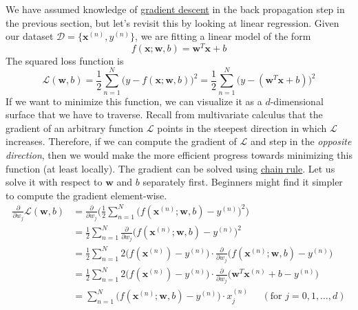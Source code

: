   \begin{example}
    \label{ex:linear-regression}
    We have assumed knowledge of \hyperref[def:gradient_descent]{gradient descent} in the back propagation step in the previous section, but let's revisit this by looking at linear regression. Given our dataset $\mathcal{D} = \{\mathbf{x}^(n), y^{(n)}\}$, we are fitting a linear model of the form 
    \begin{equation}
      f(\mathbf{x}; \mathbf{w}, b) = \mathbf{w}^T \mathbf{x} + b
    \end{equation} 
    The squared loss function is 
    \begin{equation}
      \mathcal{L}(\mathbf{w}, b) = \frac{1}{2} \sum_{n=1}^N \big( y - f(\mathbf{x}; \mathbf{w}, b) \big)^2 = \frac{1}{2} \sum_{n=1}^N \big( y - (\mathbf{w}^T \mathbf{x} + b) \big)^2  
    \end{equation}
    If we want to minimize this function, we can visualize it as a $d$-dimensional surface that we have to traverse. Recall from multivariate calculus that the gradient of an arbitrary function $\mathcal{L}$ points in the steepest direction in which $\mathcal{L}$ increases. Therefore, if we can compute the gradient of $\mathcal{L}$ and step in the \textit{opposite direction}, then we would make the more efficient progress towards minimizing this function (at least locally). The gradient can be solved using \hyperref[mv-thm:chain-rule]{chain rule}. Let us solve it with respect to $\mathbf{w}$ and $b$ separately first. Beginners might find it simpler to compute the gradient element-wise. 
    \begin{align}
      \frac{\partial}{\partial w_j} \mathcal{L}(\mathbf{w}, b) 
      & = \frac{\partial}{\partial w_j} \bigg(\frac{1}{2} \sum_{n=1}^N \Big( f (\mathbf{x}^{(n)}; \mathbf{w}, b) - y^{(n)} \Big)^2 \bigg) \\
      & = \frac{1}{2} \sum_{n=1}^N \frac{\partial}{\partial w_j} \Big( f(\mathbf{x}^{(n)}; \mathbf{w}, b) - y^{(n)}\Big)^2 \\
      & = \frac{1}{2} \sum_{n=1}^N 2 \Big( f(\mathbf{x}^{(n)}) - y^{(n)}\Big) \cdot \frac{\partial}{\partial w_j} \big( f(\mathbf{x}^{(n)}; \mathbf{w}, b) - y^{(n)} \big) \\
      & = \frac{1}{2} \sum_{n=1}^N 2 \Big( f(\mathbf{x}^{(n)}) - y^{(n)}\Big) \cdot \frac{\partial}{\partial w_j} \big( \mathbf{w}^T \mathbf{x}^{(n)} + b - y^{(n)} \big) \\
      & = \sum_{n=1}^N \big( f(\mathbf{x}^{(n)}; \mathbf{w}, b) - y^{(n)}\big) \cdot x_j^{(n)} \;\;\;\;\;(\text{for } j = 0, 1, \ldots, d)

\end{align}
\end{example}
